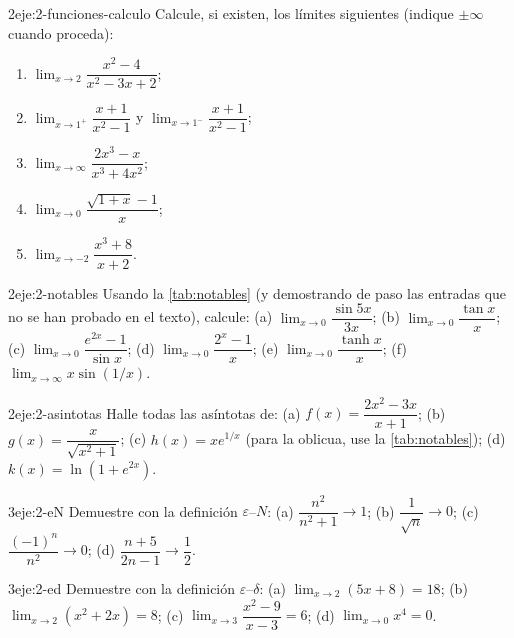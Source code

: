 \begin{ejercicio}{2}{eje:2-funciones-calculo}
Calcule, si existen, los límites siguientes (indique $\pm\infty$ cuando proceda):
\begin{enumerate}[label=(\alph*)]
  \item $\lim_{x\to2}\dfrac{x^{2}-4}{x^{2}-3x+2}$;
  \item $\lim_{x\to1^{+}}\dfrac{x+1}{x^{2}-1}$ y $\lim_{x\to1^{-}}\dfrac{x+1}{x^{2}-1}$;
  \item $\lim_{x\to\infty}\dfrac{2x^{3}-x}{x^{3}+4x^{2}}$;
  \item $\lim_{x\to0}\dfrac{\sqrt{1+x}-1}{x}$;
  \item $\lim_{x\to-2}\dfrac{x^{3}+8}{x+2}$.
\end{enumerate}
\end{ejercicio}

\begin{ejercicio}{2}{eje:2-notables}
Usando la \cref{tab:notables} (y demostrando de paso las entradas que no se han probado en el texto), calcule: (a) $\lim_{x\to0}\dfrac{\sin 5x}{3x}$; (b) $\lim_{x\to0}\dfrac{\tan x}{x}$; (c) $\lim_{x\to0}\dfrac{e^{2x}-1}{\sin x}$; (d) $\lim_{x\to0}\dfrac{2^{x}-1}{x}$; (e) $\lim_{x\to0}\dfrac{\tanh x}{x}$; (f) $\lim_{x\to\infty}x\sin(1/x)$.
\end{ejercicio}

\begin{ejercicio}{2}{eje:2-asintotas}
Halle todas las asíntotas de: (a) $f(x)=\dfrac{2x^{2}-3x}{x+1}$; (b) $g(x)=\dfrac{x}{\sqrt{x^{2}+1}}$; (c) $h(x)=xe^{1/x}$ (para la oblicua, use la \cref{tab:notables}); (d) $k(x)=\ln(1+e^{2x})$.
\end{ejercicio}

\begin{ejercicio}{3}{eje:2-eN}
Demuestre con la definición $\varepsilon$--$N$: (a) $\dfrac{n^{2}}{n^{2}+1}\to1$; (b) $\dfrac{1}{\sqrt n}\to0$; (c) $\dfrac{(-1)^{n}}{n^{2}}\to0$; (d) $\dfrac{n+5}{2n-1}\to\dfrac12$.
\end{ejercicio}

\begin{ejercicio}{3}{eje:2-ed}
Demuestre con la definición $\varepsilon$--$\delta$: (a) $\lim_{x\to2}(5x+8)=18$; (b) $\lim_{x\to2}(x^{2}+2x)=8$; (c) $\lim_{x\to3}\dfrac{x^{2}-9}{x-3}=6$; (d) $\lim_{x\to0}x^{4}=0$.
\end{ejercicio}

